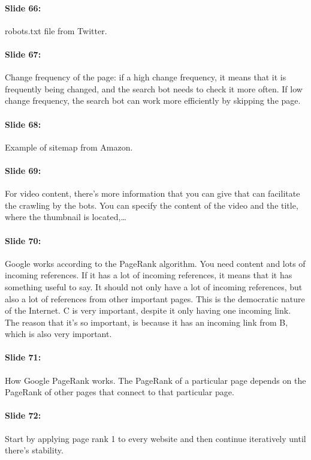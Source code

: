 \documentclass[10pt,a4paper]{report}
\begin{document}
\paragraph{Slide 66:}robots.txt file from Twitter.

\paragraph{Slide 67:}Change frequency of the page: if a high change frequency, it means that it is frequently being changed, and the search bot needs to check it more often. If low change frequency, the search bot can work more efficiently by skipping the page. 

\paragraph{Slide 68:}Example of sitemap from Amazon.

\paragraph{Slide 69:}For video content, there's more information that you can give that can facilitate the crawling by the bots. You can specify the content of the video and the title, where the thumbnail is located,…

\paragraph{Slide 70:}Google works according to the PageRank algorithm. You need content and lots of incoming references. If it has a lot of incoming references, it means that it has something useful to say. It should not only have a lot of incoming references, but also a lot of references from other important pages. This is the democratic nature of the Internet. C is very important, despite it only having one incoming link. The reason that it's so important, is because it has an incoming link from B, which is also very important.

\paragraph{Slide 71:}How Google PageRank works. The PageRank of a particular page depends on the PageRank of other pages that connect to that particular page.

\paragraph{Slide 72:}Start by applying page rank 1 to every website and then continue iteratively until there's stability.
\end{document}
